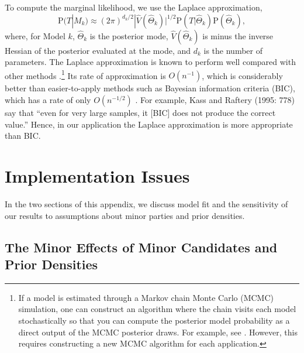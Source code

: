 \documentclass[11pt,titlepage]{article}
\renewcommand{\P}{\text{P}}
\begin{document}
To compute the marginal likelihood, we use the Laplace approximation,
\begin{equation}
  \P(T|M_k) \approx (2 \pi)^{{d_k}/2}|\widehat V(\hat\Theta_k)|^{1/2}
  \P(T|\hat{\Theta}_k) \P(\hat{\Theta}_k),
\end{equation}
where, for Model $k$, $\hat{\Theta}_k$ is the posterior mode, $\hat
V(\hat\Theta_k)$ is minus the inverse Hessian of the posterior
evaluated at the mode, and $d_k$ is the number of parameters.  The
Laplace approximation is known to perform well compared with other
methods
\citep{raft:96,lewi:raft:97,dici:kass:raft:wass:97}.\footnote{If a
  model is estimated through a Markov chain Monte Carlo (MCMC)
  simulation, one can construct an algorithm where the chain visits
  each model stochastically so that you can compute the posterior
  model probability as a direct output of the MCMC posterior draws.
  For example, see \citet{chib:95}.  However, this requires
  constructing a new MCMC algorithm for each application.}  Its rate
of approximation is $O(n^{-1})$, which is considerably better than
easier-to-apply methods such as Bayesian information criteria (BIC),
which has a rate of only $O(n^{-1/2})$ \citep{kass:tier:kada:89}.  For
example, Kass and Raftery (1995: 778) say that ``even for very large
samples, it [BIC] does not produce the correct value.''  Hence, in our
application the Laplace approximation is more appropriate than BIC.

\section{Implementation Issues} \label{a:impl}

In the two sections of this appendix, we discuss model fit and the
sensitivity of our results to assumptions about minor parties and
prior densities.


\subsection{The Minor Effects of Minor Candidates and Prior Densities} 
\label{a:sens}
\end{document}
